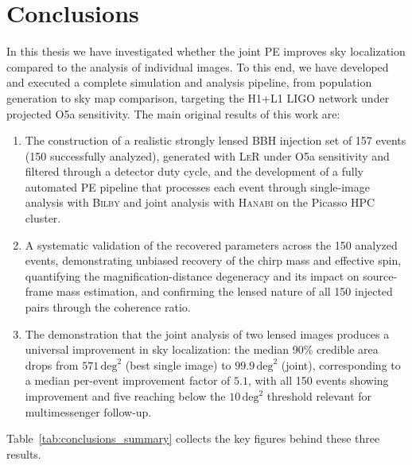 \chapter{Conclusions}
\label{Conclusions}

In this thesis we have investigated whether the joint PE improves sky localization compared to the analysis of individual images. To this end, we have developed and executed a complete simulation and analysis pipeline, from population generation to sky map comparison, targeting the H1+L1 LIGO network under projected O5a sensitivity. The main original results of this work are:

\begin{enumerate}
  \item The construction of a realistic strongly lensed BBH injection set of 157 events (150 successfully analyzed), generated with \textsc{LeR} under O5a sensitivity and filtered through a detector duty cycle, and the development of a fully automated PE pipeline that processes each event through single-image analysis with \textsc{Bilby} and joint analysis with \textsc{Hanabi} on the Picasso HPC cluster.

  \item A systematic validation of the recovered parameters across the 150 analyzed events, demonstrating unbiased recovery of the chirp mass and effective spin, quantifying the magnification-distance degeneracy and its impact on source-frame mass estimation, and confirming the lensed nature of all 150 injected pairs through the coherence ratio.

  \item The demonstration that the joint analysis of two lensed images produces a universal improvement in sky localization: the median 90\% credible area drops from $571\,\mathrm{deg}^2$ (best single image) to $99.9\,\mathrm{deg}^2$ (joint), corresponding to a median per-event improvement factor of $5.1$, with all 150 events showing improvement and five reaching below the $10\,\mathrm{deg}^2$ threshold relevant for multimessenger follow-up.
\end{enumerate}

Table~\ref{tab:conclusions_summary} collects the key figures behind these three results.

